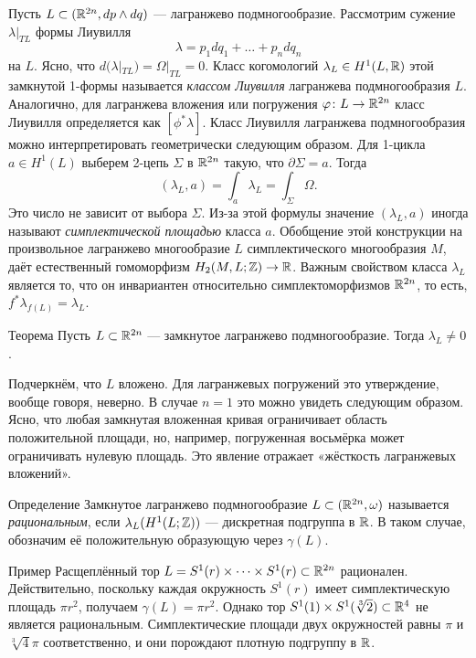Пусть $L \subset (\mathbb{R}^{2n}, dp \wedge dq)$ --- лагранжево подмногообразие.
Рассмотрим сужение $\lambda|_{TL}$ формы Лиувилля 
\[\lambda = p_1 dq_1+\dots+ p_n dq_n\]
на $L$.
Ясно, что $d (\lambda|_{TL}) = \Omega|_{TL} = 0$.
Класс когомологий $\lambda_L\in H^1(L,\mathbb{R})$ этой замкнутой 1-формы называется \emph{классом Лиувилля} лагранжева подмногообразия $L$.
Аналогично, для лагранжева вложения или погружения $\varphi\colon L \to \mathbb{R}^{2n}$ класс Лиувилля определяется как $[\phi^\ast \lambda]$.
Класс Лиувилля лагранжева подмногообразия можно интерпретировать геометрически следующим образом.
Для 1-цикла $a\in H^1 (L)$ выберем 2-цепь $\Sigma$ в $\mathbb{R}^{2n}$ такую, что $\partial\Sigma = a$.
Тогда
\[(\lambda_L, a) = \int_a\lambda_L = \int_\Sigma\Omega.\]
Это число не зависит от выбора $\Sigma$.
Из-за этой формулы значение $(\lambda_L, a)$ иногда называют \emph{симплектической площадью} класса $a$.
Обобщение этой конструкции на произвольное лагранжево многообразие $L$
 симплектического многообразия $M$, даёт естественный гомоморфизм $H_2 (M, L; \mathbb{Z}) \to \mathbb{R}$.
Важным свойством класса $\lambda_L$ является то, что он инвариантен относительно симплектоморфизмов $\mathbb{R}^{2n}$,
то есть,
$f^\ast \lambda_{f (L)} = \lambda_L$.

\begin{thm}[(\cite{G1})]{Теорема}\label{3.2.A}
Пусть $L \subset \mathbb{R}^{2n}$ --- замкнутое лагранжево подмногообразие.
Тогда $\lambda_L \ne 0$.
\end{thm}

Подчеркнём, что $L$ вложено.
Для лагранжевых погружений это утверждение, вообще говоря, неверно.
В случае $n = 1$ это можно увидеть следующим образом.
Ясно, что любая замкнутая вложенная кривая ограничивает область положительной площади, но, например, погруженная восьмёрка может ограничивать нулевую площадь.
Это явление отражает «жёсткость лагранжевых вложений».

\begin{ex*}{Определение}
Замкнутое лагранжево подмногообразие $L \subset (\mathbb{R}^{2n}, \omega)$
называется \emph{рациональным}, если $\lambda_L (H^1 (L; \mathbb{Z}))$ ---
дискретная подгруппа в $\mathbb{R}$.
В таком случае, обозначим её положительную образующую через $\gamma(L)$.
\end{ex*}

\begin{ex*}{Пример}
Расщеплённый тор $L = S^1 (r) \times\dots\times S^1 (r) \subset
\mathbb{R}^{2n}$ рационален. 
Действительно, поскольку каждая окружность $S^1 (r)$ имеет
симплектическую площадь $\pi r^2$, получаем $\gamma (L) = \pi r^2$. 
Однако тор $S^1(1)\times S^1(\sqrt[3]{2}) \subset \mathbb{R}^4$ не является
рациональным.
Симплектические площади двух окружностей равны $\pi$  и
$\sqrt[3]{4}\pi$ соответственно, и они порождают плотную подгруппу в
$\mathbb{R}$.
\end{ex*}

